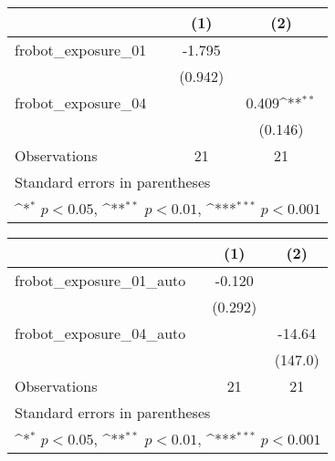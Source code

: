 {
\def\sym#1{\ifmmode^{#1}\else\(^{#1}\)\fi}
\begin{tabular}{l*{2}{c}}
\toprule
                    &\multicolumn{1}{c}{(1)}         &\multicolumn{1}{c}{(2)}         \\
\midrule
frobot\_exposure\_01  &      -1.795         &                     \\
                    &     (0.942)         &                     \\
\addlinespace
frobot\_exposure\_04  &                     &       0.409\sym{**} \\
                    &                     &     (0.146)         \\
\midrule
Observations        &          21         &          21         \\
\bottomrule
\multicolumn{3}{l}{\footnotesize Standard errors in parentheses}\\
\multicolumn{3}{l}{\footnotesize \sym{*} \(p<0.05\), \sym{**} \(p<0.01\), \sym{***} \(p<0.001\)}\\
\end{tabular}
}
{
\def\sym#1{\ifmmode^{#1}\else\(^{#1}\)\fi}
\begin{tabular}{l*{2}{c}}
\toprule
                    &\multicolumn{1}{c}{(1)}         &\multicolumn{1}{c}{(2)}         \\
\midrule
frobot\_exposure\_01\_auto&      -0.120         &                     \\
                    &     (0.292)         &                     \\
\addlinespace
frobot\_exposure\_04\_auto&                     &      -14.64         \\
                    &                     &     (147.0)         \\
\midrule
Observations        &          21         &          21         \\
\bottomrule
\multicolumn{3}{l}{\footnotesize Standard errors in parentheses}\\
\multicolumn{3}{l}{\footnotesize \sym{*} \(p<0.05\), \sym{**} \(p<0.01\), \sym{***} \(p<0.001\)}\\
\end{tabular}
}
